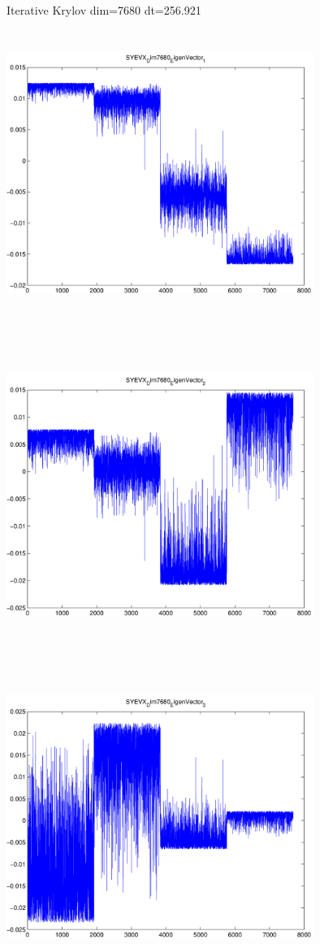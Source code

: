 \documentclass[9pt]{article}
\theoremstyle{plain}
\theoremstyle{definition}
\theoremstyle{remark}
\numberwithin{equation}{section}
\begin{document}
Iterative Krylov dim=7680 dt=256.921
\includegraphics[width=10.0cm,height=10.0cm]{SYEVX_Dim7680_EigenVector_1.pdf}

\includegraphics[width=10.0cm,height=10.0cm]{SYEVX_Dim7680_EigenVector_2.pdf}

\includegraphics[width=10.0cm,height=10.0cm]{SYEVX_Dim7680_EigenVector_3.pdf}
\end{document}
